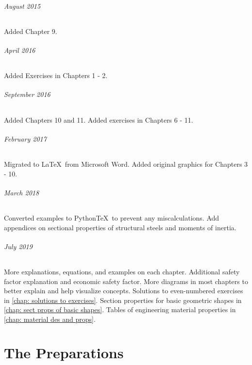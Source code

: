 \documentclass[
10pt,
a4paper,
openany,
svgnames,
]{book}
\begin{document}
\paragraph{August 2015}
Added Chapter 9.

\paragraph{April 2016}
Added Exercises in Chapters 1 - 2.

\paragraph{September 2016}
Added Chapters 10 and 11. Added exercises in Chapters 6 - 11.

\paragraph{February 2017}
Migrated to \LaTeX\ from Microsoft Word. Added original graphics for Chapters 3 - 10.

\paragraph{March 2018}
Converted examples to Python\TeX\ to prevent any miscalculations. Add appendices on sectional properties of structural steels and moments of inertia.

\paragraph{July 2019}
More explanations, equations, and examples on each chapter. Additional safety factor explanation and economic safety factor. More diagrams in most chapters to better explain and help visualize concepts. Solutions to even-numbered exercises in \cref{chap: solutions to exercises}. Section properties for basic geometric shapes in \cref{chap: sect props of basic shapes}. Tables of engineering material properties in \cref{chap: material des and props}.

\tableofcontents

\listoffigures

\listoftables

\mainmatter

\part{The Preparations}
\end{document}
